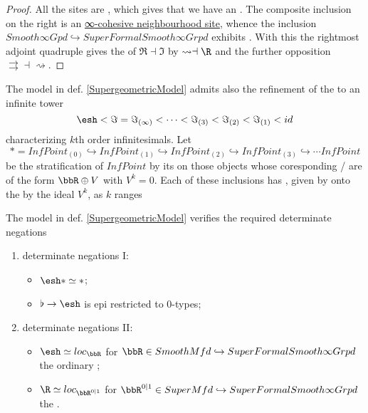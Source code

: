 \begin{proof}
All the sites are , which gives that we have an . The composite inclusion on the right is an \href{http://ncatlab.org/nlab/show/differential+cohesive+%28infinity%2C1%29-topos#PresentationOnInfinitesimalNeighbourhoodSites}{∞-cohesive neighbourhood site}, whence the inclusion $Smooth\infty Gpd\hookrightarrow SuperFormalSmooth\infty Grpd$ exhibits \LabRef{nLab}{differential cohesion}.
With this the rightmost adjoint quadruple gives the  of $\Re \dashv \Im$ by $\rightsquigarrow \dashv \R$ and the further opposition $\rightrightarrows \dashv \rightsquigarrow$.
\end{proof}
\begin{remark}
\label{}\hypertarget{}{}
The model in def. \ref{SupergeometricModel} admits also the refinement of the  to an infinite tower
\begin{displaymath}
\esh 
\lt
\Im
=
\Im_{(\infty)}
\lt
\cdots
\lt
\Im_{(3)}
\lt
\Im_{(2)}
\lt
\Im_{(1)}
\lt
id
\end{displaymath}
characterizing $k$th order infinitesimals. Let
\begin{displaymath}
\ast
=
InfPoint_{(0)}
\hookrightarrow
InfPoint_{(1)}
\hookrightarrow
InfPoint_{(2)}
\hookrightarrow
InfPoint_{(3)}
\hookrightarrow
\cdots
InfPoint
\end{displaymath}
be the stratification of $InfPoint$ by its  on those objects whose coresponding / are of the form $\bbR \oplus V$ with $V^k = 0$. Each of these inclusions has , given by  onto the  by the ideal $V^k$, as $k$ ranges
\end{remark}
\begin{prop}
\label{DeterminateNegationsRealized}\hypertarget{DeterminateNegationsRealized}{}
The model in def. \ref{SupergeometricModel} verifies the required determinate negations
\begin{enumerate}%
\item determinate negations I:
\begin{itemize}%
\item $\esh  \ast \simeq \ast$;
\item $\flat \to \esh $ is epi restricted to 0-types;
\end{itemize}
\item determinate negations II:
\begin{itemize}%
\item $\esh  \simeq loc_{\bbR}$ for $\bbR \in SmoothMfd \hookrightarrow SuperFormalSmooth\infty Grpd$ the ordinary ;
\item $\R \simeq loc_{\bbR^{0|1}}$ for $\bbR^{0|1} \in SuperMfd \hookrightarrow SuperFormalSmooth\infty Grpd$ the .
\end{itemize}
\end{enumerate}
\end{prop}
